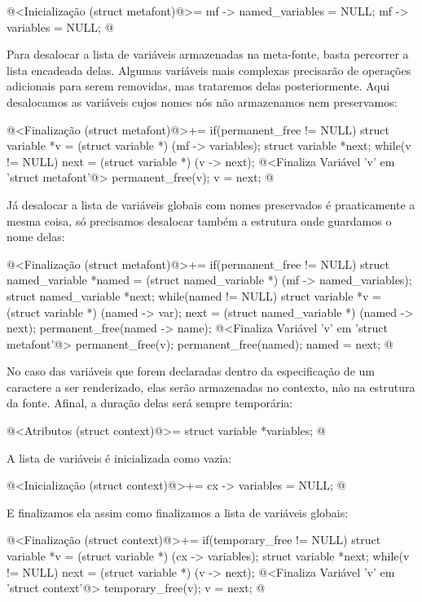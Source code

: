 \iniciocodigo
@<Inicialização (struct metafont)@>=
mf -> named_variables = NULL;
mf -> variables = NULL;
@
\fimcodigo

Para desalocar a lista de variáveis armazenadas na meta-fonte, basta
percorrer a lista encadeada delas. Algumas variáveis mais complexas
precisarão de operações adicionais para serem removidas, mas
trataremos delas posteriormente. Aqui desalocamos as variáveis cujos
nomes nós não armazenamos nem preservamos:

\iniciocodigo
@<Finalização (struct metafont)@>+=
if(permanent_free != NULL){
  struct variable *v = (struct variable *) (mf -> variables);
  struct variable *next;
  while(v != NULL){
    next = (struct variable *) (v -> next);
    @<Finaliza Variável 'v' em 'struct metafont'@>
    permanent_free(v);
    v = next;
  }
}
@
\fimcodigo

Já desalocar a lista de variáveis globais com nomes preservados é
praaticamente a mesma coisa, só precisamos desalocar também a
estrutura onde guardamos o nome delas:

\iniciocodigo
@<Finalização (struct metafont)@>+=
if(permanent_free != NULL){
  struct named_variable *named = (struct named_variable *)
                                   (mf -> named_variables);
  struct named_variable *next;
  while(named != NULL){
    struct variable *v = (struct variable *) (named -> var);
    next = (struct named_variable *) (named -> next);
    permanent_free(named -> name);
    @<Finaliza Variável 'v' em 'struct metafont'@>
    permanent_free(v);
    permanent_free(named);
    named = next;
  }
}
@
\fimcodigo

No caso das variáveis que forem declaradas dentro da especificação de
um caractere a ser renderizado, elas serão armazenadas no contexto,
não na estrutura da fonte. Afinal, a duração delas será sempre
temporária:

\iniciocodigo
@<Atributos (struct context)@>=
  struct variable *variables;
@
\fimcodigo

A lista de variáveis é inicializada como vazia:

\iniciocodigo
@<Inicialização (struct context)@>+=
cx -> variables = NULL;
@
\fimcodigo

E finalizamos ela assim como finalizamos a lista de variáveis globais:

\iniciocodigo
@<Finalização (struct context)@>+=
if(temporary_free != NULL){
  struct variable *v = (struct variable *) (cx -> variables);
  struct variable *next;
  while(v != NULL){
    next = (struct variable *) (v -> next);
    @<Finaliza Variável 'v' em 'struct context'@>
    temporary_free(v);
    v = next;
  }
}
@
\fimcodigo

